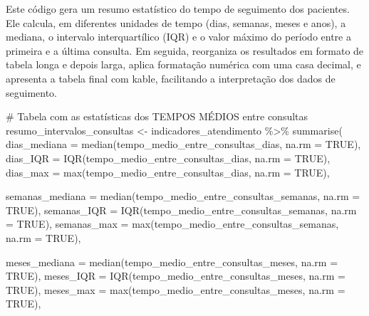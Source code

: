 \documentclass[
]{article}
\newenvironment{Shaded}{\begin{snugshade}}{\end{snugshade}}
\newcommand{\AttributeTok}[1]{\textcolor[rgb]{0.40,0.45,0.13}{#1}}
\newcommand{\CommentTok}[1]{\textcolor[rgb]{0.37,0.37,0.37}{#1}}
\newcommand{\ConstantTok}[1]{\textcolor[rgb]{0.56,0.35,0.01}{#1}}
\newcommand{\FunctionTok}[1]{\textcolor[rgb]{0.28,0.35,0.67}{#1}}
\newcommand{\NormalTok}[1]{\textcolor[rgb]{0.00,0.23,0.31}{#1}}
\newcommand{\OtherTok}[1]{\textcolor[rgb]{0.00,0.23,0.31}{#1}}
\newcommand{\SpecialCharTok}[1]{\textcolor[rgb]{0.37,0.37,0.37}{#1}}
\begin{document}
Este código gera um resumo estatístico do tempo de seguimento dos
pacientes. Ele calcula, em diferentes unidades de tempo (dias, semanas,
meses e anos), a mediana, o intervalo interquartílico (IQR) e o valor
máximo do período entre a primeira e a última consulta. Em seguida,
reorganiza os resultados em formato de tabela longa e depois larga,
aplica formatação numérica com uma casa decimal, e apresenta a tabela
final com kable, facilitando a interpretação dos dados de seguimento.

\begin{Shaded}
\begin{Highlighting}[]
\CommentTok{\# Tabela com as estatísticas dos TEMPOS MÉDIOS entre consultas}
\NormalTok{resumo\_intervalos\_consultas }\OtherTok{\textless{}{-}}\NormalTok{ indicadores\_atendimento }\SpecialCharTok{\%\textgreater{}\%}
  \FunctionTok{summarise}\NormalTok{(}
    \AttributeTok{dias\_mediana    =} \FunctionTok{median}\NormalTok{(tempo\_medio\_entre\_consultas\_dias, }\AttributeTok{na.rm =} \ConstantTok{TRUE}\NormalTok{),}
    \AttributeTok{dias\_IQR        =} \FunctionTok{IQR}\NormalTok{(tempo\_medio\_entre\_consultas\_dias, }\AttributeTok{na.rm =} \ConstantTok{TRUE}\NormalTok{),}
    \AttributeTok{dias\_max        =} \FunctionTok{max}\NormalTok{(tempo\_medio\_entre\_consultas\_dias, }\AttributeTok{na.rm =} \ConstantTok{TRUE}\NormalTok{),}

    \AttributeTok{semanas\_mediana =} \FunctionTok{median}\NormalTok{(tempo\_medio\_entre\_consultas\_semanas, }\AttributeTok{na.rm =} \ConstantTok{TRUE}\NormalTok{),}
    \AttributeTok{semanas\_IQR     =} \FunctionTok{IQR}\NormalTok{(tempo\_medio\_entre\_consultas\_semanas, }\AttributeTok{na.rm =} \ConstantTok{TRUE}\NormalTok{),}
    \AttributeTok{semanas\_max     =} \FunctionTok{max}\NormalTok{(tempo\_medio\_entre\_consultas\_semanas, }\AttributeTok{na.rm =} \ConstantTok{TRUE}\NormalTok{),}

    \AttributeTok{meses\_mediana   =} \FunctionTok{median}\NormalTok{(tempo\_medio\_entre\_consultas\_meses, }\AttributeTok{na.rm =} \ConstantTok{TRUE}\NormalTok{),}
    \AttributeTok{meses\_IQR       =} \FunctionTok{IQR}\NormalTok{(tempo\_medio\_entre\_consultas\_meses, }\AttributeTok{na.rm =} \ConstantTok{TRUE}\NormalTok{),}
    \AttributeTok{meses\_max       =} \FunctionTok{max}\NormalTok{(tempo\_medio\_entre\_consultas\_meses, }\AttributeTok{na.rm =} \ConstantTok{TRUE}\NormalTok{),}


\end{Highlighting}
\end{Shaded}
\end{document}
